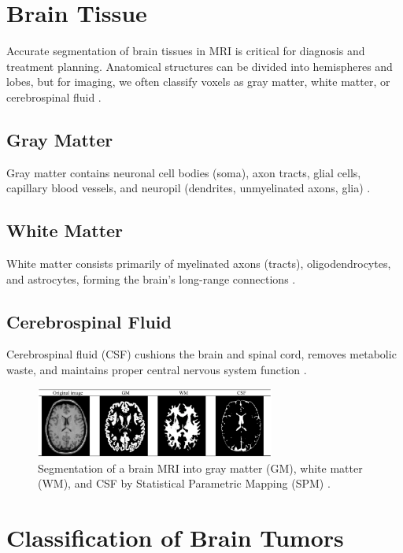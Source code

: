 \section{Brain Tissue}
Accurate segmentation of brain tissues in MRI is critical for diagnosis and treatment planning. Anatomical structures can be divided into hemispheres and lobes, but for imaging, we often classify voxels as gray matter, white matter, or cerebrospinal fluid \cite{ref1}.

\subsection{Gray Matter}
Gray matter contains neuronal cell bodies (soma), axon tracts, glial cells, capillary blood vessels, and neuropil (dendrites, unmyelinated axons, glia) \cite{ref5}.

\subsection{White Matter}
White matter consists primarily of myelinated axons (tracts), oligodendrocytes, and astrocytes, forming the brain’s long-range connections \cite{ref5}.

\subsection{Cerebrospinal Fluid}
Cerebrospinal fluid (CSF) cushions the brain and spinal cord, removes metabolic waste, and maintains proper central nervous system function \cite{ref6}.

\begin{figure}[ht]
  \centering
  \includegraphics[width=0.7\textwidth]{Images/Chapter0/parts.png}
  \caption{Segmentation of a brain MRI into gray matter (GM), white matter (WM), and CSF by Statistical Parametric Mapping (SPM) \cite{ref7}.}
  \label{fig:spm-segmentation}
\end{figure}

\section{Classification of Brain Tumors}
\label{sec:classification-brain-tumors}


